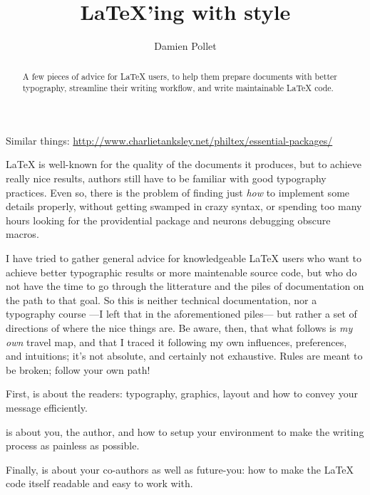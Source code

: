 \documentclass[a4paper,twoside,nofonts]{tufte-handout}
\title{\LaTeX'ing with style}
\author{Damien Pollet}
\date{}
\begin{document}
\maketitle

\begin{abstract}
  A few pieces of advice for \LaTeX{} users, to help them prepare documents with better typography, streamline their writing workflow, and write maintainable \LaTeX{} code.
\end{abstract}
\begin{todoenv}
  \noindent Similar things:
  \url{http://www.charlietanksley.net/philtex/essential-packages/}
\end{todoenv}
\vfill

\begin{fullwidth}
  \begin{multicols}{2}
    \noindent
    \LaTeX{} is well-known for the quality of the documents it produces, but to achieve really nice results, authors still have to be familiar with good typography practices.
    Even so, there is the problem of finding just \emph{how} to implement some details properly, without getting swamped in crazy syntax, or spending too many hours looking for the providential package and neurons debugging obscure macros.
    
    I have tried to gather general advice for knowledgeable \LaTeX{} users who want to achieve better typographic results or more maintenable source code, but who do not have the time to go through the litterature and the piles of documentation on the path to that goal.
    So this is neither technical documentation, nor a typography course ---I left that in the aforementioned piles--- but rather a set of directions of where the nice things are.
    Be aware, then, that what follows is \emph{my own} travel map, and that I traced it following my own influences, preferences, and intuitions; it's not absolute, and certainly not exhaustive.
    Rules are meant to be broken; follow your own path!
  \end{multicols}
  \bigskip
  
  \begin{multicols}{3}
    \noindent
    First, \emph{} is about the readers: typography, graphics, layout and how to convey your message efficiently.
    
    \columnbreak\noindent
    \emph{} is about you, the author, and how to setup your environment to make the writing process as painless as possible.
    
    \columnbreak\noindent
    Finally, \emph{} is about your co-authors as well as future-you: how to make the \LaTeX{} code itself readable and easy to work with.
  \end{multicols}
\end{fullwidth}
\end{document}
